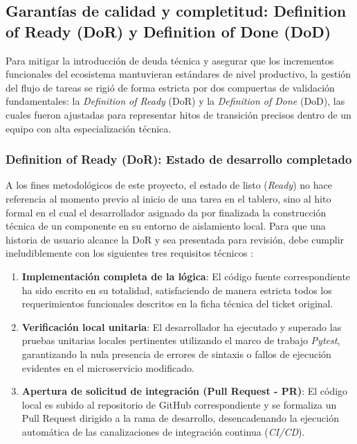 \subsection{Garantías de calidad y completitud: Definition of Ready (DoR) y Definition of Done (DoD)}

Para mitigar la introducción de deuda técnica y asegurar que los incrementos funcionales del ecosistema mantuvieran estándares de nivel productivo, la gestión del flujo de tareas se rigió de forma estricta por dos compuertas de validación fundamentales: la \textit{Definition of Ready} (DoR) y la \textit{Definition of Done} (DoD), las cuales fueron ajustadas para representar hitos de transición precisos dentro de un equipo con alta especialización técnica.

\subsubsection{Definition of Ready (DoR): Estado de desarrollo completado}

A los fines metodológicos de este proyecto, el estado de listo (\textit{Ready}) no hace referencia al momento previo al inicio de una tarea en el tablero, sino al hito formal en el cual el desarrollador asignado da por finalizada la construcción técnica de un componente en su entorno de aislamiento local. Para que una historia de usuario alcance la DoR y sea presentada para revisión, debe cumplir ineludiblemente con los siguientes tres requisitos técnicos :

\begin{enumerate}
    \item \textbf{Implementación completa de la lógica}: El código fuente correspondiente ha sido escrito en su totalidad, satisfaciendo de manera estricta todos los requerimientos funcionales descritos en la ficha técnica del ticket original.
    \item \textbf{Verificación local unitaria}: El desarrollador ha ejecutado y superado las pruebas unitarias locales pertinentes utilizando el marco de trabajo \textit{Pytest}, garantizando la nula presencia de errores de sintaxis o fallos de ejecución evidentes en el microservicio modificado.
    \item \textbf{Apertura de solicitud de integración (Pull Request - PR)}: El código local es subido al repositorio de GitHub correspondiente y se formaliza un Pull Request dirigido a la rama de desarrollo, desencadenando la ejecución automática de las canalizaciones de integración continua (\textit{CI/CD}).
\end{enumerate}

